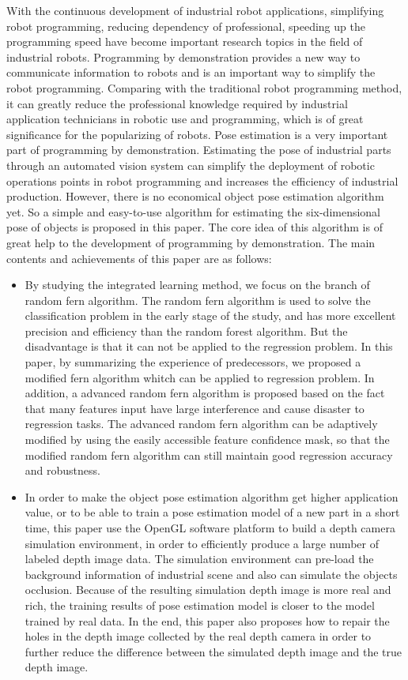 \begin{englishabstract}
With the continuous development of industrial robot applications, simplifying robot programming, reducing dependency of professional, speeding up the programming speed have become important research topics in the field of industrial robots. Programming by demonstration provides a new way to communicate information to robots and is an important way to simplify the robot programming. Comparing with the traditional robot programming method, it can greatly reduce the professional knowledge required by industrial application technicians in robotic use and programming, which is of great significance for the popularizing of robots. Pose estimation is a very important part of programming by demonstration. Estimating the pose of industrial parts through an automated vision system can simplify the deployment of robotic operations points in robot programming and increases the efficiency of industrial production. However, there is no economical object pose estimation algorithm yet. So a simple and easy-to-use algorithm for estimating the six-dimensional pose of objects is proposed in this paper. The core idea of ​​this algorithm is of great help to the development of programming by demonstration. The main contents and achievements of this paper are as follows:


\begin{itemize}
\item By studying the integrated learning method, we focus on the branch of random fern algorithm. The random fern algorithm is used to solve the classification problem in the early stage of the study, and has more excellent precision and efficiency than the random forest algorithm. But the disadvantage is that it can not be applied to the regression problem. In this paper, by summarizing the experience of predecessors, we proposed a modified fern algorithm whitch can be applied to regression problem. In addition, a advanced random fern algorithm is proposed based on the fact that many features input have large interference and cause disaster to regression tasks. The advanced random fern algorithm can be adaptively modified by using the easily accessible feature confidence mask, so that the modified random fern algorithm can still maintain good regression accuracy and robustness.

\item In order to make the object pose estimation algorithm get higher application value, or to be able to train a pose estimation model of a new part in a short time, this paper use the OpenGL software platform to build a depth camera simulation environment, in order to efficiently produce a large number of labeled depth image data. The simulation environment can pre-load the background information of industrial scene and also can simulate the objects occlusion. Because of the resulting simulation depth image is more real and rich, the training results of pose estimation model is closer to the model trained by real data. In the end, this paper also proposes how to repair the holes in the depth image collected by the real depth camera in order to further reduce the difference between the simulated depth image and the true depth image.


\end{itemize}
\end{englishabstract}
